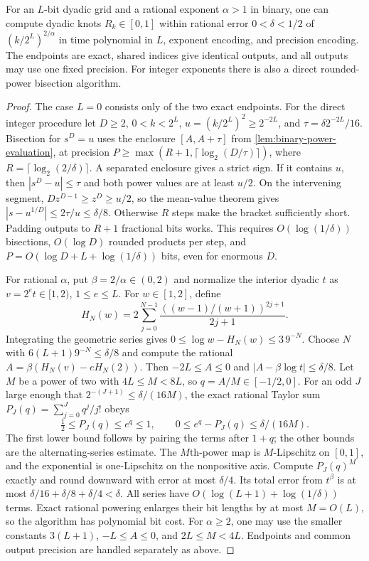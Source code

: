 \begin{lemma}\label{lem:inverse-power-index}
For an $L$-bit dyadic grid and a rational exponent $\alpha>1$ in
binary, one can compute dyadic knots $R_k\in[0,1]$ within rational
error $0<\delta<1/2$ of $(k/2^L)^{2/\alpha}$ in time polynomial
in $L$, exponent encoding, and precision encoding. The endpoints are
exact, shared indices give identical outputs, and all outputs may
use one fixed precision. For integer exponents there is also a direct
rounded-power bisection algorithm.
\end{lemma}
\begin{proof}
The case $L=0$ consists only of the two exact endpoints. For the direct
integer procedure let $D\ge2$, $0<k<2^L$, $u=(k/2^L)^2\ge2^{-2L}$,
and $\tau=\delta2^{-2L}/16$. Bisection for $s^D=u$ uses the enclosure
$[A,A+\tau]$ from \cref{lem:binary-power-evaluation}, at precision
$P\ge\max(R+1,\lceil\log_2(D/\tau)\rceil)$, where
$R=\lceil\log_2(2/\delta)\rceil$. A separated enclosure gives a
strict sign. If it contains $u$, then $|s^D-u|\le\tau$ and both
power values are at least $u/2$. On the intervening segment,
$Dz^{D-1}\ge z^D\ge u/2$, so the mean-value theorem gives
$|s-u^{1/D}|\le2\tau/u\le\delta/8$. Otherwise $R$ steps make
the bracket sufficiently short. Padding outputs to $R+1$ fractional
bits works. This requires $O(\log(1/\delta))$ bisections,
$O(\log D)$ rounded products per step, and
$P=O(\log D+L+\log(1/\delta))$ bits, even for enormous $D$.

For rational $\alpha$, put $\beta=2/\alpha\in(0,2)$ and normalize
the interior dyadic $t$ as $v=2^et\in[1,2)$, $1\le e\le L$.
For $w\in[1,2]$, define
\[
 H_N(w)=2\sum_{j=0}^{N-1}\frac{((w-1)/(w+1))^{2j+1}}{2j+1}.
\]
Integrating the geometric series gives
$0\le\log w-H_N(w)\le3\,9^{-N}$.
Choose $N$ with $6(L+1)9^{-N}\le\delta/8$ and compute the rational
$A=\beta(H_N(v)-eH_N(2))$. Then $-2L\le A\le0$ and
$|A-\beta\log t|\le\delta/8$. Let $M$ be a power of two with
$4L\le M<8L$, so $q=A/M\in[-1/2,0]$. For an odd $J$ large
enough that $2^{-(J+1)}\le\delta/(16M)$, the exact rational Taylor
sum $P_J(q)=\sum_{j=0}^Jq^j/j!$ obeys
\[
 \tfrac12\le P_J(q)\le e^q\le1,
 \qquad 0\le e^q-P_J(q)\le\delta/(16M).
\]
The first lower bound follows by pairing the terms after $1+q$;
the other bounds are the alternating-series estimate.
The $M$th-power map is $M$-Lipschitz on $[0,1]$, and the exponential
is one-Lipschitz on the nonpositive axis. Compute $P_J(q)^M$ exactly
and round downward with error at most $\delta/4$. Its total error
from $t^\beta$ is at most $\delta/16+\delta/8+\delta/4<\delta$.
All series have $O(\log(L+1)+\log(1/\delta))$ terms. Exact rational
powering enlarges their bit lengths by at most $M=O(L)$, so the
algorithm has polynomial bit cost. For $\alpha\ge2$, one may use
the smaller constants $3(L+1)$, $-L\le A\le0$, and $2L\le M<4L$.
Endpoints and common output precision are handled separately as above.
\end{proof}

